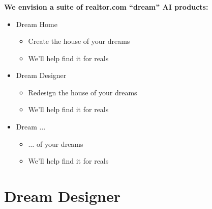 \documentclass[t,xcolor={dvipsnames}]{beamer} %
\begin{document}
\begin{frame}
\frametitle{\insertsection}
\textbf{We envision a suite of realtor.com ``dream'' AI products:}
\vspace{0.2cm}

\begin{itemize}
  \item<2->{\color{myred}Dream Home}
    \begin{itemize}
      \item<3->[$\hookrightarrow$] Create the house of your dreams
      \item<4->[$\hookrightarrow$] We'll help find it for reals
    \end{itemize}
  \item<5->{\color{myred}Dream Designer}
    \begin{itemize}
      \item<6->[$\hookrightarrow$] Redesign the house of your dreams
      \item<7->[$\hookrightarrow$] We'll help find it for reals
    \end{itemize}
  \item<8->{\color{myred}Dream $\ldots$}
    \begin{itemize}
      \item<9->[$\hookrightarrow$] $\ldots$ of your dreams
      \item<10->[$\hookrightarrow$] We'll help find it for reals
    \end{itemize}

\end{itemize}

\end{frame}

\section{Dream Designer}
\end{document}
